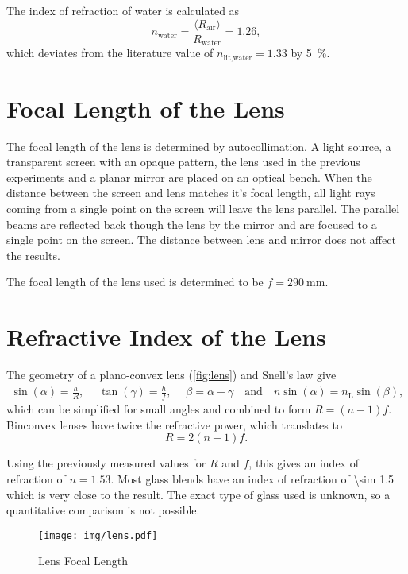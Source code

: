 The index of refraction of water is calculated as
\begin{equation*}
	n_\text{water} = \frac{\langle R_\text{air} \rangle}{R_\text{water}} = \num{1.26},
\end{equation*}
which deviates from the literature value of $n_\text{lit,water} = \num{1.33}$ by \SI{5}{\percent}.

\section{Focal Length of the Lens}

The focal length of the lens is determined by autocollimation.
A light source, a transparent screen with an opaque pattern, the lens used in the previous experiments and a planar mirror are placed on an optical bench.
When the distance between the screen and lens matches it's focal length, all light rays coming from a single point on the screen will leave the lens parallel.
The parallel beams are reflected back though the lens by the mirror and are focused to a single point on the screen.
The distance between lens and mirror does not affect the results.

The focal length of the lens used is determined to be $f = \SI{290}{\mm}$.

\section{Refractive Index of the Lens}
The geometry of a plano-convex lens (\autoref{fig:lens}) and Snell's law give
\begin{gather*}
	\sin(\alpha) = \frac{h}{R}, \quad\;
	\tan(\gamma) = \frac{h}{f}, \quad\;
	\beta = \alpha + \gamma \quad \text{and} \quad
	n \sin(\alpha) = n_\text{L} \sin(\beta),
\end{gather*}
which can be simplified for small angles and combined to form $R = \left(n - 1\right)f$.
Binconvex lenses have twice the refractive power, which translates to
\begin{equation*}
	R = 2 \left(n - 1\right)f.
\end{equation*}

Using the previously measured values for $R$ and $f$, this gives an index of refraction of $n = \num{1.53}$.
Most glass blends have an index of refraction of \num{\sim 1.5} which is very close to the result.
The exact type of glass used is unknown, so a quantitative comparison is not possible.

\begin{figure}[tbp]
	\centering
	\texttt{[image: img/lens.pdf]}
	\caption{Lens Focal Length}
	\label{fig:lens}
\end{figure}
